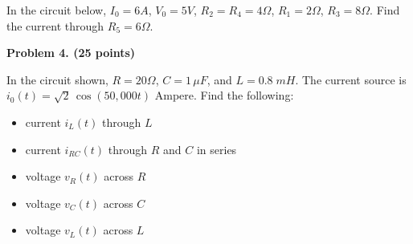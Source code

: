 \begin{enumerate}
In the circuit below, $I_0=6A$, $V_0=5V$, $R_2=R_4=4\Omega$, $R_1=2\Omega$,
$R_3=8\Omega$. Find the current through $R_5=6\Omega$.


\begin{comment}
{\bf Solution:} Use superposition. First consider the current source $I_0$ 
only with $V_0=0$ (short-circuit). Convert the delta composed of the top three 
resistors ($R_1$, $R_2$ and $R_5$) to Y:
\[	R_a=\frac{2\times 4}{2+6+4}=\frac{2}{3},\;\;\;\;
	R_b=\frac{2\times 6}{2+6+4}=1,\;\;\;\;R_c=\frac{4\times 6}{2+6+4}=2 \]
where $R_a$ is in series with $I_0$, and $R_b$ and $R_c$ are in series with 
$R_4$ and $R_3$, respectively. Treating the two branches as two voltage dividers,
we find the voltage across $R_5$ is zero and therefore $I'=0$,

Next consider the voltage source $V_0$ only, with $I_0=0$ (open-circuit).
The total resistance of the loop is $15\Omega$, and the total current is 
$I_{total}=5V/15\Omega=1/3\;A$, and the current through $R_5$ can be  found
by current divider to be $I''=1/6\;A$. The current due to both $I_0$ and $V_0$
is therefore $I=I'+I''=1/6\;A$ 
\end{comment}

\end{enumerate}






\item {\bf Problem 4. (25 points)}


In the circuit shown, $R=20 \Omega$, $C=1\,\mu F$, and $L=0.8\;mH$. 
The current source is $i_0(t)=\sqrt{2}\,\cos(50,000 t)$ Ampere. 
Find the following:
\begin{itemize}
\item current $i_L(t)$ through $L$ 
\item current $i_{RC}(t)$ through $R$ and $C$ in series
\item voltage $v_R(t)$ across $R$
\item voltage $v_C(t)$ across $C$
\item voltage $v_L(t)$ across $L$
\end{itemize}


